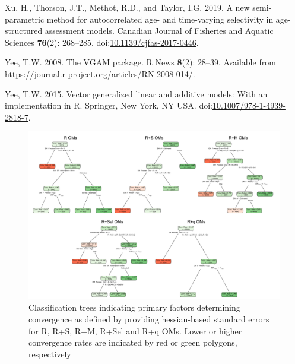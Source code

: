 \documentclass[
  12pt,
]{article}
\newlength{\cslhangindent}
\newenvironment{CSLReferences}[2] %
 {\begin{list}{}{%
  \setlength{\itemindent}{0pt}
  \setlength{\leftmargin}{0pt}
  \setlength{\parsep}{0pt}
  \ifodd #1
   \setlength{\leftmargin}{\cslhangindent}
   \setlength{\itemindent}{-1\cslhangindent}
  \fi
  \setlength{\itemsep}{#2\baselineskip}}}
 {\end{list}}
\begin{document}
\begin{CSLReferences}{1}{0}
Xu, H., Thorson, J.T., Methot, R.D., and Taylor, I.G. 2019. A new
semi-parametric method for autocorrelated age- and time-varying
selectivity in age-structured assessment models. Canadian Journal of
Fisheries and Aquatic Sciences \textbf{76}(2): 268--285.
doi:\href{https://doi.org/10.1139/cjfas-2017-0446}{10.1139/cjfas-2017-0446}.

Yee, T.W. 2008. The {VGAM} package. R News \textbf{8}(2): 28--39.
Available from
\url{https://journal.r-project.org/articles/RN-2008-014/}.

Yee, T.W. 2015. Vector generalized linear and additive models: With an
implementation in {R}. Springer, New York, NY USA.
doi:\href{https://doi.org/10.1007/978-1-4939-2818-7}{10.1007/978-1-4939-2818-7}.

\end{CSLReferences}

\pagebreak

\clearpage

\begin{landscape}
\begin{figure}
\begin{center}
\includegraphics{convergence_classification_plots}
\end{center}
\caption{Classification trees indicating primary factors determining convergence as defined by providing hessian-based standard errors for R, R+S, R+M, R+Sel and R+q OMs. Lower or higher convergence rates are indicated by red or green polygons, respectively}\label{conv_class}
\end{figure}
\end{landscape}
\end{document}
